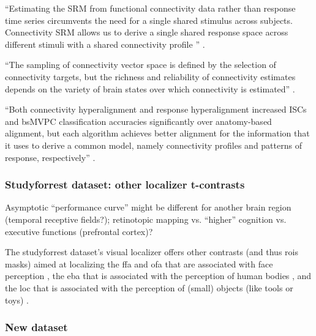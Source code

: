``Estimating the SRM from functional connectivity data rather than response time
series circumvents the need for a single shared stimulus across subjects.
%
Connectivity SRM allows us to derive a single shared response space across
different stimuli with a shared connectivity profile
\citep{nastase2019leveraging}'' \citep{kumar2020brainiak}.

%
``The sampling of connectivity vector space is defined by the selection of
connectivity targets, but the richness and reliability of connectivity estimates
depends on the variety of brain states over which connectivity is estimated''
\citep{haxby2020hyperalignment}.

%
``Both connectivity hyperalignment and response hyperalignment increased ISCs
and bsMVPC classification accuracies significantly over anatomy-based alignment,
but each algorithm achieves better alignment for the information that it uses to
derive a common model, namely connectivity profiles and patterns of response,
respectively'' \citep{guntupalli2018computational}.



\subsubsection{Studyforrest dataset: other localizer t-contrasts}


%
Asymptotic ``performance curve'' might be different for another brain region
(temporal receptive fields?); retinotopic mapping vs. ``higher'' cognition  vs.
executive functions (prefrontal cortex)?


The studyforrest dataset's visual localizer \citep{sengupta2016extension} offers
other contrasts (and thus \acp{roi} masks) aimed at localizing the \ac{ffa} and
\ac{ofa} that are associated with face perception \citep{kanwisher1997ffa,
pitcher2011occipitalfacearea}, the \ac{eba} that is associated with the
perception of human bodies \citep{downing2001bodyarea}, and the \ac{loc} that is
associated with the perception of (small) objects (like tools or toys)
\citep{malach1995loc}.



\subsubsection{New dataset}

